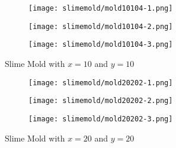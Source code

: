 \begin{figure}[tbh]
\begin{center}
	\begin{subfigure}[tbh]{0.30\textwidth}
	\begin{center}
	\texttt{[image: slimemold/mold10104-1.png]}
	\end{center}
	\end{subfigure}
\hfill
	\begin{subfigure}[tbh]{0.30\textwidth}
	\begin{center}
	\texttt{[image: slimemold/mold10104-2.png]}
	\end{center}
	\end{subfigure}
\hfill
	\begin{subfigure}[tbh]{0.30\textwidth}
	\begin{center}
	\texttt{[image: slimemold/mold10104-3.png]}
	\end{center}
	\end{subfigure}
\caption{ Slime Mold with $x=10$ and $y=10$}
\end{center}
\end{figure} \label{mold1010}

\begin{figure}[tbh]
\begin{center}
	\begin{subfigure}[tbh]{0.30\textwidth}
	\begin{center}
	\texttt{[image: slimemold/mold20202-1.png]}
	\end{center}
	\end{subfigure}
\hfill
	\begin{subfigure}[tbh]{0.30\textwidth}
	\begin{center}
	\texttt{[image: slimemold/mold20202-2.png]}
	\end{center}
	\end{subfigure}
\hfill
	\begin{subfigure}[tbh]{0.30\textwidth}
	\begin{center}
	\texttt{[image: slimemold/mold20202-3.png]}
	\end{center}
	\end{subfigure}
\caption{ Slime Mold with $x=20$ and $y=20$}
\end{center}
\end{figure} \label{mold2020}


